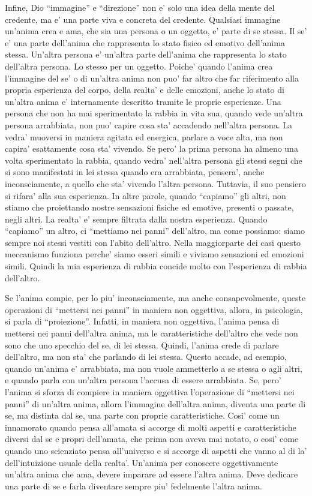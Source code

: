 Infine, Dio ``immagine'' e ``direzione'' non e' solo una idea della mente del credente, ma e' una parte viva e concreta del credente. Qualsiasi immagine un'anima crea e ama, che sia una persona o un oggetto, e' parte di se stessa. Il se' e' una parte dell'anima che rappresenta lo stato fisico ed emotivo dell'anima stessa. Un'altra persona e' un'altra parte dell'anima che rappresenta lo stato dell'altra persona. Lo stesso per un oggetto. Poiche' quando l'anima crea l'immagine del se' o di un'altra anima non puo' far altro che far riferimento alla propria esperienza del corpo, della realta' e delle emozioni, anche lo stato di un'altra anima e' internamente descritto tramite le proprie esperienze. Una persona che non ha mai sperimentato la rabbia in vita sua, quando vede un'altra persona arrabbiata, non puo' capire cosa sta' accadendo nell'altra persona. La vedra' muoversi in maniera agitata ed energica, parlare a voce alta, ma non capira' esattamente cosa sta' vivendo. Se pero' la prima persona ha almeno una volta sperimentato la rabbia, quando vedra' nell'altra persona gli stessi segni che si sono manifestati in lei stessa quando era arrabbiata, pensera', anche inconsciamente, a quello che sta' vivendo l'altra persona. Tuttavia, il suo pensiero si rifara' alla sua esperienza. In altre parole, quando ``capiamo'' gli altri, non stiamo che proiettando nostre sensazioni fisiche ed emotive, presenti o passate, negli altri. La realta' e' sempre filtrata dalla nostra esperienza. Quando ``capiamo'' un altro, ci ``mettiamo nei panni'' dell'altro, ma come possiamo: siamo sempre noi stessi vestiti con l'abito dell'altro. Nella maggiorparte dei casi questo meccanismo funziona perche' siamo esseri simili e viviamo sensazioni ed emozioni simili. Quindi la mia esperienza di rabbia concide molto con l'esperienza di rabbia dell'altro.

Se l'anima compie, per lo piu' inconsciamente, ma anche consapevolmente, queste operazioni di ``mettersi nei panni'' in maniera non oggettiva, allora, in psicologia, si parla di ``proiezione''. Infatti, in maniera non oggettiva, l'anima pensa di mettersi nei panni dell'altra anima, ma le caratteristiche dell'altro che vede non sono che uno specchio del se, di lei stessa. Quindi, l'anima crede di parlare dell'altro, ma non sta' che parlando di lei stessa. Questo accade, ad esempio, quando un'anima e' arrabbiata, ma non vuole ammetterlo a se stessa o agli altri, e quando parla con un'altra persona l'accusa di essere arrabbiata.
Se, pero' l'anima si sforza di compiere in maniera oggettiva l'operazione di ``mettersi nei panni'' di un'altra anima, allora l'immagine dell'altra anima, diventa una parte di se, ma distinta dal se, una parte con proprie caratteristiche. Cosi' come un innamorato quando pensa all'amata si accorge di molti aspetti e caratteristiche diversi dal se e propri dell'amata, che prima non aveva mai notato, o cosi' come quando uno scienziato pensa all'universo e si accorge di aspetti che vanno al di la' dell'intuizione usuale della realta'. Un'anima per conoscere oggettivamente un'altra anima che ama, devere imparare ad essere l'altra anima. Deve dedicare una parte di se e farla diventare sempre piu' fedelmente l'altra anima.

